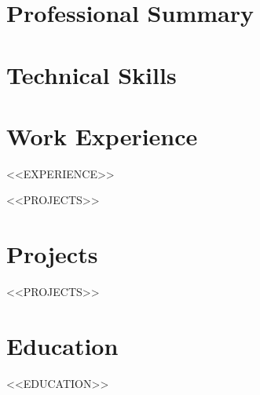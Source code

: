 \documentclass[<<FONT_SIZE>>,a4paper,sans]{moderncv}
\begin{document}
\makecvtitle

\section{Professional Summary}

\section{Technical Skills}

\section{Work Experience}
<<EXPERIENCE>>

\ifx\empty<<PROJECTS>>\empty
\else
\section{Projects}
<<PROJECTS>>
\fi

\section{Education}
<<EDUCATION>>
\end{document}
